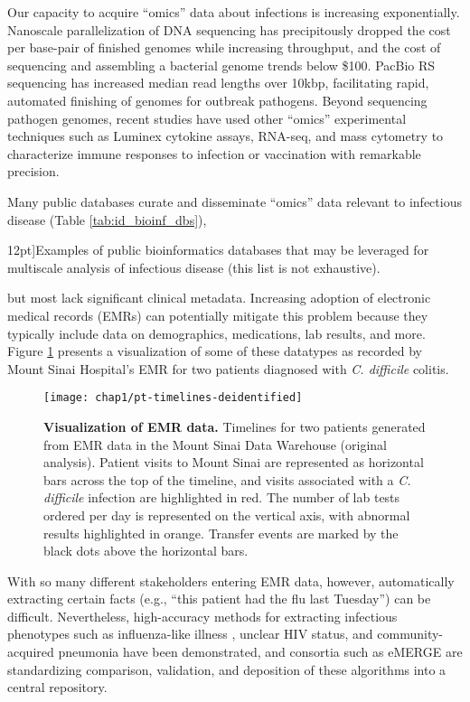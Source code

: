 Our capacity to acquire “omics” data about infections is increasing exponentially. Nanoscale parallelization of DNA sequencing has precipitously dropped the cost per base-pair of finished genomes while increasing throughput, and the cost of sequencing and assembling a bacterial genome trends below \$100.\autocite{Didelot2012} PacBio RS sequencing has increased median read lengths over 10kbp, facilitating rapid, automated finishing of genomes for outbreak pathogens.\autocite{Chin2011,Rasko2011} Beyond sequencing pathogen genomes, recent studies have used other “omics” experimental techniques such as Luminex cytokine assays, RNA-seq, and mass cytometry to characterize immune responses to infection or vaccination with remarkable precision.\autocite{Mejias2014,Querec2009}

Many public databases curate and disseminate “omics” data relevant to infectious disease (Table \ref{tab:id_bioinf_dbs}), 
\begin{table*}[ht]
  
  \caption[Bioinformatics databases for infectious diseases][12pt]{Examples of public bioinformatics databases that may be leveraged for multiscale analysis of infectious disease (this list is not exhaustive).}
  \label{tab:id_bioinf_dbs}
\end{table*}
but most lack significant clinical metadata. Increasing adoption of electronic medical records (EMRs) can potentially mitigate this problem because they typically include data on demographics, medications, lab results, and more. Figure \ref{fig:emr_sample_viz} presents a visualization of some of these datatypes as recorded by Mount Sinai Hospital’s EMR for two patients diagnosed with \textit{C. difficile} colitis.
\begin{figure}[htb]
  \texttt{[image: chap1/pt-timelines-deidentified]}               
  \caption[Visualization of EMR data]{\textbf{Visualization of EMR data.} Timelines for two patients generated from EMR data in the Mount Sinai Data Warehouse (original analysis). Patient visits to Mount Sinai are represented as horizontal bars across the top of the timeline, and visits associated with a \textit{C. difficile} infection are highlighted in red.  The number of lab tests ordered per day is represented on the vertical axis, with abnormal results highlighted in orange.  Transfer events are marked by the black dots above the horizontal bars.}
  \label{fig:emr_sample_viz}
\end{figure}
With so many different stakeholders entering EMR data, however, automatically extracting certain facts (e.g., “this patient had the flu last Tuesday”) can be difficult. Nevertheless, high-accuracy methods for extracting infectious phenotypes such as influenza-like illness , unclear HIV status,\autocite{Felsen2014} and community-acquired pneumonia\autocite{DeLisle2013} have been demonstrated, and consortia such as eMERGE are standardizing comparison, validation, and deposition of these algorithms into a central repository.\autocite{Pathak2013a}

